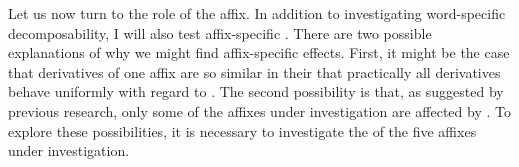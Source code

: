 Let us now turn to the role of the affix. In addition to investigating word-specific decomposability, I will also test affix-specific . There are two possible explanations of why we might find affix-specific effects. 
First, it might be the case that derivatives of one affix are so similar in their  that practically all derivatives behave uniformly with regard to . 
The second possibility is that, as suggested by previous research, only some of the affixes under investigation are affected by . To explore these possibilities, it is necessary to investigate the  of the five affixes under investigation. 


\begin{table}[h]
	\caption{Lexical segmentability hierarchies of  affixes}
	\label{fig:Lexical segmentability hierarchies of  affixes} 
\end{table}

